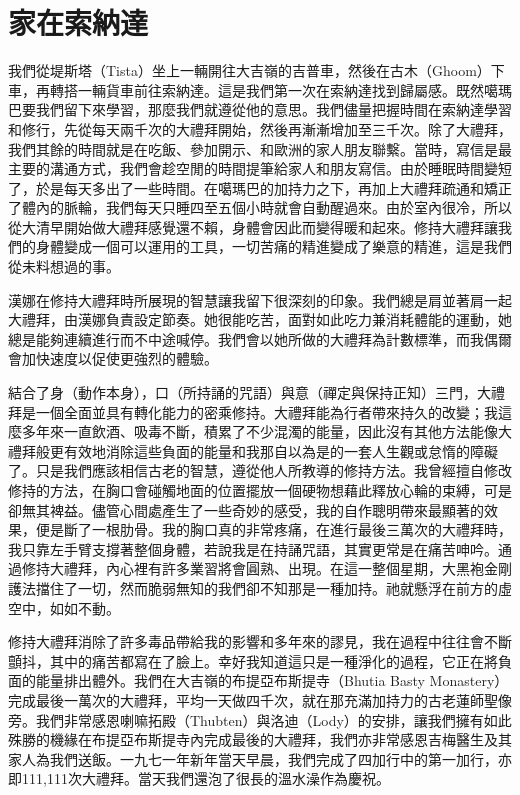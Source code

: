 \chapter{家在索納達}

我們從堤斯塔（Tista）坐上一輛開往大吉嶺的吉普車，然後在古木（Ghoom）下車，再轉搭一輛貨車前往索納達。這是我們第一次在索納達找到歸屬感。既然噶瑪巴要我們留下來學習，那麼我們就遵從他的意思。我們儘量把握時間在索納達學習和修行，先從每天兩千次的大禮拜開始，然後再漸漸增加至三千次。除了大禮拜，我們其餘的時間就是在吃飯、參加開示、和歐洲的家人朋友聯繫。當時，寫信是最主要的溝通方式，我們會趁空閒的時間提筆給家人和朋友寫信。由於睡眠時間變短了，於是每天多出了一些時間。在噶瑪巴的加持力之下，再加上大禮拜疏通和矯正了體內的脈輪，我們每天只睡四至五個小時就會自動醒過來。由於室內很冷，所以從大清早開始做大禮拜感覺還不賴，身體會因此而變得暖和起來。修持大禮拜讓我們的身體變成一個可以運用的工具，一切苦痛的精進變成了樂意的精進，這是我們從未料想過的事。

漢娜在修持大禮拜時所展現的智慧讓我留下很深刻的印象。我們總是肩並著肩一起大禮拜，由漢娜負責設定節奏。她很能吃苦，面對如此吃力兼消耗體能的運動，她總是能夠連續進行而不中途喊停。我們會以她所做的大禮拜為計數標準，而我偶爾會加快速度以促使更強烈的體驗。

結合了身（動作本身），口（所持誦的咒語）與意（禪定與保持正知）三門，大禮拜是一個全面並具有轉化能力的密乘修持。大禮拜能為行者帶來持久的改變；我這麼多年來一直飲酒、吸毒不斷，積累了不少混濁的能量，因此沒有其他方法能像大禮拜般更有效地消除這些負面的能量和我那自以為是的一套人生觀或怠惰的障礙了。只是我們應該相信古老的智慧，遵從他人所教導的修持方法。我曾經擅自修改修持的方法，在胸口會碰觸地面的位置擺放一個硬物想藉此釋放心輪的束縛，可是卻無其裨益。儘管心間處產生了一些奇妙的感受，我的自作聰明帶來最顯著的效果，便是斷了一根肋骨。我的胸口真的非常疼痛，在進行最後三萬次的大禮拜時，我只靠左手臂支撐著整個身體，若說我是在持誦咒語，其實更常是在痛苦呻吟。通過修持大禮拜，內心裡有許多業習將會圓熟、出現。在這一整個星期，大黑袍金剛護法擋住了一切，然而脆弱無知的我們卻不知那是一種加持。祂就懸浮在前方的虛空中，如如不動。

修持大禮拜消除了許多毒品帶給我的影響和多年來的謬見，我在過程中往往會不斷顫抖，其中的痛苦都寫在了臉上。幸好我知道這只是一種淨化的過程，它正在將負面的能量排出體外。我們在大吉嶺的布提亞布斯提寺（Bhutia
Basty
Monastery）完成最後一萬次的大禮拜，平均一天做四千次，就在那充滿加持力的古老蓮師聖像旁。我們非常感恩喇嘛拓殿（Thubten）與洛迪（Lody）的安排，讓我們擁有如此殊勝的機緣在布提亞布斯提寺內完成最後的大禮拜，我們亦非常感恩吉梅醫生及其家人為我們送飯。一九七一年新年當天早晨，我們完成了四加行中的第一加行，亦即111,111次大禮拜。當天我們還泡了很長的溫水澡作為慶祝。

